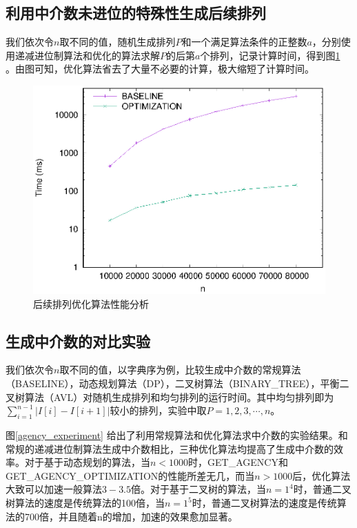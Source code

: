 \documentclass[10pt, twocolumn]{ctexart}
\begin{document}
\subsection{利用中介数未进位的特殊性生成后续排列}
我们依次令$n$取不同的值，随机生成排列$P$和一个满足算法条件的正整数$a$，分别使用递减进位制算法和优化的算法求解$P$的后第$a$个排列，记录计算时间，得到图\ref{teshu} 。由图可知，优化算法省去了大量不必要的计算，极大缩短了计算时间。
\begin{figure}[H]
\includegraphics[width=1\columnwidth]{pictures/teshu.eps}
\caption{后续排列优化算法性能分析}
\label{teshu}
\end{figure}
\subsection{生成中介数的对比实验}
我们依次令$n$取不同的值，以字典序为例，比较生成中介数的常规算法（BASELINE），动态规划算法（DP），二叉树算法（BINARY\_TREE），平衡二叉树算法（AVL）对随机生成排列和均匀排列的运行时间。其中均匀排列即为$\sum_{i=1}^{n-1}\left|I[i]-I[i+1]\right|$较小的排列，实验中取$P=1,2,3,\cdots,n$。
\iffalse

图\ref{agency_experiment} 给出了利用常规算法和优化算法求中介数的实验结果。和常规的递减进位制算法生成中介数相比，三种优化算法均提高了生成中介数的效率。对于基于动态规划的算法，当$n<1000$时，GET\_AGENCY和GET\_AGENCY\_OPTIMIZATION的性能所差无几，而当$n>1000$后，优化算法大致可以加速一般算法$3-3.5$倍。对于基于二叉树的算法，当$n=1^4$时，普通二叉树算法的速度是传统算法的100倍，当$n=1^5$时，普通二叉树算法的速度是传统算法的700倍，并且随着n的增加，加速的效果愈加显著。
\end{document}
